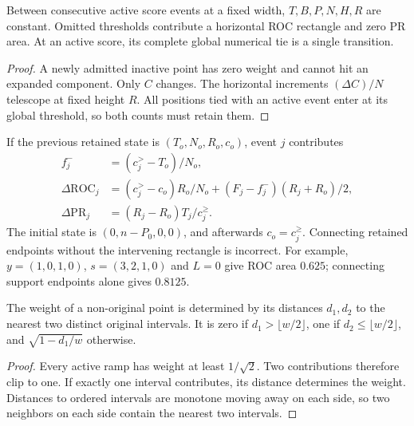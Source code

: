 \begin{lemma}
Between consecutive active score events at a fixed width, $T,B,P,N,H,R$
are constant. Omitted thresholds contribute a horizontal ROC rectangle and
zero PR area. At an active score, its complete global numerical tie is a
single transition.
\end{lemma}
\begin{proof}
A newly admitted inactive point has zero weight and cannot hit an expanded
component. Only $C$ changes. The horizontal increments
$(\Delta C)/N$ telescope at fixed height $R$. All positions tied with an
active event enter at its global threshold, so both counts must retain them.
\end{proof}

If the previous retained state is $(T_o,N_o,R_o,c_o)$, event $j$ contributes
\begin{align}
 f_j^-&=(c_j^>-T_o)/N_o,\\
 \Delta\mathrm{ROC}_j&=
 (c_j^>-c_o)R_o/N_o+(F_j-f_j^-)(R_j+R_o)/2,\\
 \Delta\mathrm{PR}_j&=(R_j-R_o)T_j/c_j^\ge.
\end{align}
The initial state is $(0,n-P_0,0,0)$, and afterwards $c_o=c_j^\ge$.
Connecting retained endpoints without the intervening rectangle is
incorrect. For example, $y=(1,0,1,0)$, $s=(3,2,1,0)$ and $L=0$ give ROC
area $0.625$; connecting support endpoints alone gives $0.8125$.

\begin{lemma}
The weight of a non-original point is determined by its distances $d_1,d_2$
to the nearest two distinct original intervals. It is zero if
$d_1>\lfloor w/2\rfloor$, one if $d_2\le\lfloor w/2\rfloor$, and
$\sqrt{1-d_1/w}$ otherwise.
\end{lemma}
\begin{proof}
Every active ramp has weight at least $1/\sqrt2$. Two contributions therefore
clip to one. If exactly one interval contributes, its distance determines
the weight. Distances to ordered intervals are monotone moving away on each
side, so two neighbors on each side contain the nearest two intervals.
\end{proof}

